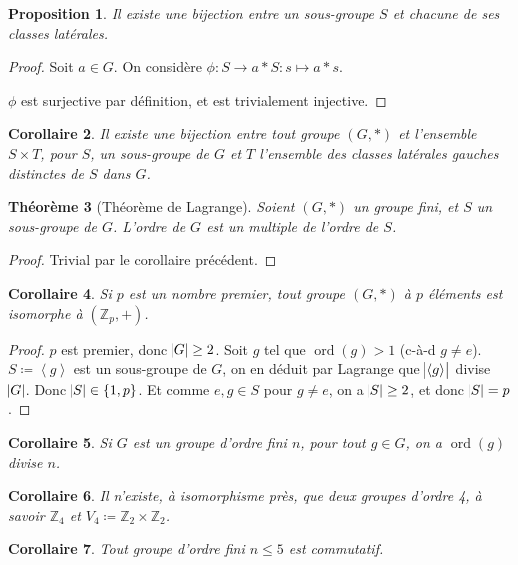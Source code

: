 \documentclass{article}
\newtheorem{thm}{Théorème}[section]
\newtheorem{prp}[thm]{Proposition}
\newtheorem{cor}[thm]{Corollaire}
\theoremstyle{definition}
\theoremstyle{remark}
\DeclareMathOperator{\ord}{ord}
\newcommand{\Z}{\mathbb Z}
\newcommand{\eng}[1]{\left\langle#1\right\rangle}
\begin{document}
		\begin{prp} Il existe une bijection entre un sous-groupe $S$ et chacune de ses classes latérales.
		\end{prp}

		\begin{proof} Soit $a \in G$. On considère $\phi : S \to a*S : s \mapsto a*s$.

		$\phi$ est surjective par définition, et est trivialement injective.
		\end{proof}

		\begin{cor} Il existe une bijection entre tout groupe $(G, *)$ et l'ensemble $S \times T$, pour $S$, un sous-groupe de $G$ et $T$ l'ensemble des classes
		latérales gauches distinctes de $S$ dans $G$.
		\end{cor}

		\begin{thm}[Théorème de Lagrange] Soient $(G, *)$ un groupe fini, et $S$ un sous-groupe de $G$. L'ordre de $G$ est un multiple de l'ordre de $S$.
		\end{thm}

		\begin{proof} Trivial par le corollaire précédent.
		\end{proof}

		\begin{cor} Si $p$ est un nombre premier, tout groupe $(G, *)$ à $p$ éléments est isomorphe à $(\Z_p, +)$.
		\end{cor}

		\begin{proof} $p$ est premier, donc $\abs G \geq 2$. Soit $g$ tel que $\ord(g) > 1$ (c-à-d $g \neq e$). $S \coloneqq \eng g$ est un sous-groupe de $G$,
		on en déduit par Lagrange que $\abs {\eng g}$ divise $\abs G$. Donc $\abs S \in \{1, p\}$. Et comme $e, g \in S$ pour $g \neq e$, on a $\abs S \geq 2$,
		et donc $\abs S = p$.
		\end{proof}

		\begin{cor} Si $G$ est un groupe d'ordre fini $n$, pour tout $g \in G$, on a $\ord(g)$ divise $n$.
		\end{cor}

		\begin{cor} Il n'existe, à isomorphisme près, que deux groupes d'ordre 4, à savoir $\Z_4$ et $V_4 \coloneqq \Z_2 \times \Z_2$.
		\end{cor}

		\begin{cor} Tout groupe d'ordre fini $n  \leq 5$ est commutatif.
		\end{cor}
\end{document}
